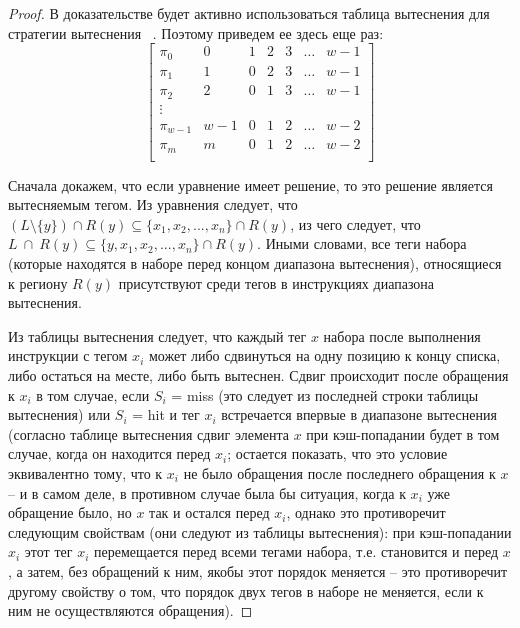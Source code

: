 \theoremtext{\ref{LRU_equation}}{\DiapazonLRU}
\begin{proof}
  В доказательстве будет активно использоваться таблица вытеснения
  для стратегии вытеснения \LRU~\cite{policy_tables}. Поэтому
  приведем ее здесь еще раз:
  $$
  \left[
    \begin{array}{c|cccccc}
      \pi_0 & 0 & 1 & 2 & 3 & \dots & w{-}1 \\
      \pi_1 & 1 & 0 & 2 & 3 & \dots & w{-}1 \\
      \pi_2 & 2 & 0 & 1 & 3 & \dots & w{-}1 \\
      \vdots &  &  &  & & & \\
      \pi_{w-1} & w{-}1 & 0 & 1 & 2 & \dots & w{-}2 \\
      \pi_m & m & 0 & 1 & 2 & \dots & w{-}2 \\
    \end{array}
  \right]
  $$

  Сначала докажем, что если уравнение имеет решение, то это решение
  является вытесняемым тегом. Из уравнения следует, что
  $(L\setminus\{y\}) \cap R(y) \subseteq \{x_1, x_2, ..., x_n\} \cap
  R(y)$, из чего следует, что $L~\cap~R(y) \subseteq \{y, x_1, x_2,
  ..., x_n\} \cap R(y)$. Иными словами, все теги набора (которые
  находятся в наборе перед концом диапазона вытеснения), относящиеся
  к региону $R(y)$ присутствуют
  среди тегов в инструкциях диапазона вытеснения.

  Из таблицы вытеснения следует, что каждый тег $x$ набора после
  выполнения инструкции с тегом $x_i$ может либо сдвинуться на одну позицию к
  концу списка, либо остаться на месте, либо быть вытеснен. Сдвиг
  происходит после обращения к $x_i$ в том случае, если $S_i$ = miss
  (это следует из последней строки таблицы вытеснения) или $S_i$ = hit
   и тег $x_i$ встречается впервые в диапазоне вытеснения (согласно таблице
  вытеснения сдвиг элемента $x$ при кэш-попадании будет в том случае, когда
  он находится перед $x_i$; остается показать, что это условие
  эквивалентно тому, что к $x_i$ не было обращения после последнего
  обращения к $x$ -- и в самом деле, в противном случае была бы
  ситуация, когда к $x_i$ уже обращение было, но $x$ так и остался
  перед $x_i$, однако это противоречит следующим свойствам (они
  следуют из таблицы вытеснения): при кэш-попадании $x_i$ этот тег
  $x_i$ перемещается перед всеми
  тегами набора, т.е. становится и перед $x$, а затем, без обращений к
  ним, якобы этот порядок меняется -- это противоречит другому
  свойству о том, что порядок двух тегов в наборе не меняется, если
  к ним не осуществляются обращения).


\end{proof}
